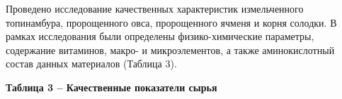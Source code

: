 Проведено исследование качественных характеристик измельченного
топинамбура, пророщенного овса, пророщенного ячменя и корня солодки. В
рамках исследования были определены физико-химические параметры,
содержание витаминов, макро- и микроэлементов, а также аминокислотный
состав данных материалов (Таблица 3).

{\bfseries Таблица 3 -- Качественные показатели сырья}

